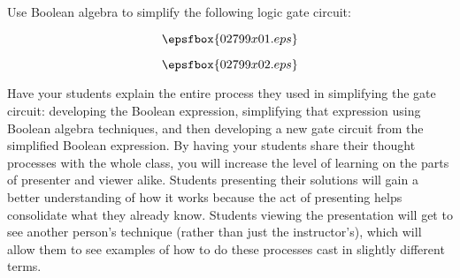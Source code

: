 

Use Boolean algebra to simplify the following logic gate circuit:

$$\epsfbox{02799x01.eps}$$







$$\epsfbox{02799x02.eps}$$







Have your students explain the entire process they used in simplifying the gate circuit: developing the Boolean expression, simplifying that expression using Boolean algebra techniques, and then developing a new gate circuit from the simplified Boolean expression.  By having your students share their thought processes with the whole class, you will increase the level of learning on the parts of presenter and viewer alike.  Students presenting their solutions will gain a better understanding of how it works because the act of presenting helps consolidate what they already know.  Students viewing the presentation will get to see another person's technique (rather than just the instructor's), which will allow them to see examples of how to do these processes cast in slightly different terms.




